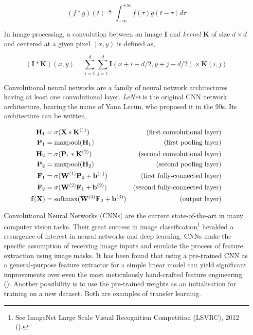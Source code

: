 $$(f * g)(t) \triangleq \int_{-\infty}^{+\infty}f(\tau)g(t-\tau)d\tau$$

In image processing, a convolution between an image $\mathbf{I}$ and \emph{kernel} $\mathbf{K}$ of size $d \times d$ and centered at a given pixel $(x, y)$ is defined as,

$$(\mathbf{I} * \mathbf{K})(x, y) = \sum_{i = 1}^{d}\sum_{j = 1}^{d} \mathbf{I}(x + i -d/2, y + j - d/2) \times \mathbf{K}(i, j)$$

Convolutional neural networks are a family of neural network architectures having at least one convolutional layer. \emph{LeNet} is the original CNN network architecture, bearing the name of Yann Lecun, who proposed it in the 90s. Its architecture can be written,

\begin{align}
\mathbf{H}_1 &= \sigma(\mathbf{X} * \mathbf{K}^{(1)}) & \text{(first convolutional layer)}\notag \\
\mathbf{P}_1 &= \text{maxpool}(\mathbf{H}_1) & \text{(first pooling layer)}\notag \\
\mathbf{H}_2 &= \sigma(\mathbf{P}_1 * \mathbf{K}^{(2)}) & \text{(second convolutional layer)} \notag \\
\mathbf{P}_2 &= \text{maxpool}(\mathbf{H}_2) & \text{(second pooling layer)} \notag \\
\mathbf{F}_1 &= \sigma(\mathbf{W}^{(1)}\mathbf{P}_2 + \mathbf{b}^{(1)}) & \text{(first fully-connected layer)} \notag \\
\mathbf{F}_2 &= \sigma(\mathbf{W}^{(2)}\mathbf{F}_1 + \mathbf{b}^{(2)}) & \text{(second fully-connected layer)} \notag \\
\mathbf{f}(\mathbf{X}) &= \text{softmax}(\mathbf{W}^{(3)}\mathbf{F}_2 + \mathbf{b}^{(3)}) & \text{(output layer)} \notag
\end{align}

Convolutional Neural Networks (CNNs) are the current state-of-the-art in many computer vision tasks. Their great success in image classification\footnote{See ImageNet Large Scale Visual Recognition Competition (LSVRC), 2012 (\cite{krizhevsky2012imagenet}).} heralded a resurgence of interest in neural networks and deep learning. CNNs make the specific assumption of receiving image inputs and emulate the process of feature extraction using image masks. It has been found that using a pre-trained CNN as a general-purpose feature extractor for a simple linear model can yield significant improvements over even the most meticulously hand-crafted feature engineering (\cite{sharif2014cnn}). Another possibility is to use the pre-trained weights as an initialisation for training on a new dataset. Both are examples of transfer learning.

